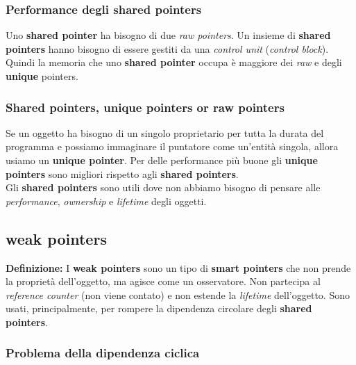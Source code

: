 
\subsubsection{Performance degli shared pointers}

\textsf{\small Uno \textbf{shared pointer} ha bisogno di due \emph{raw pointers}. Un insieme di \textbf{shared pointers} hanno bisogno di essere gestiti da una \emph{control unit} (\emph{control block}). Quindi la memoria che uno \textbf{shared pointer} occupa è maggiore dei \emph{raw} e degli \textbf{unique} pointers.} \\

\subsubsection{Shared pointers, unique pointers or raw pointers}

\textsf{\small Se un oggetto ha bisogno di un singolo proprietario per tutta la durata del programma e possiamo immaginare il puntatore come un'entità singola, allora usiamo un \textbf{unique pointer}. Per delle performance più buone gli \textbf{unique pointers} sono migliori rispetto agli \textbf{shared pointers}.} \\

\textsf{\small Gli \textbf{shared pointers} sono utili dove non abbiamo bisogno di pensare alle \emph{performance}, \emph{ownership} e \emph{lifetime} degli oggetti.}

\subsection{weak pointers}

\textsf{\small \textbf{Definizione: } I \textbf{weak pointers} sono un tipo di \textbf{smart pointers} che non prende la proprietà dell'oggetto, ma agisce come un osservatore. Non partecipa al \emph{reference counter} (non viene contato) e non estende la \emph{lifetime} dell'oggetto. Sono usati, principalmente, per rompere la dipendenza circolare degli \textbf{shared pointers}.} \\

\subsubsection{Problema della dipendenza ciclica}


